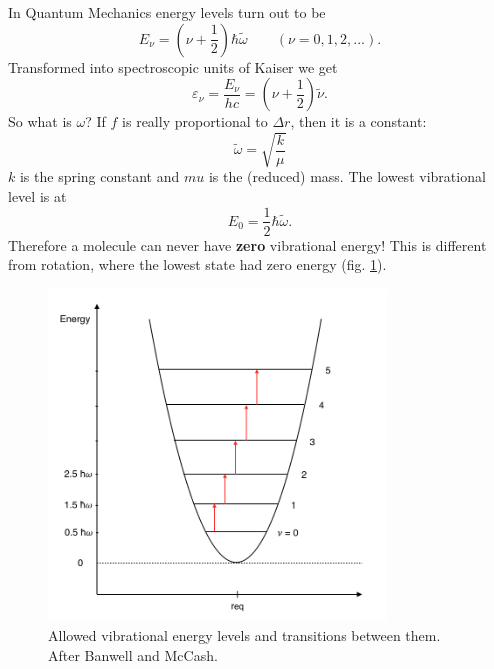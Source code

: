 \documentclass[a4paper,fleqn]{article}
\renewcommand{\epsilon}{\varepsilon}  %
\begin{document}
In Quantum Mechanics energy levels turn out to be 
\begin{equation}
E_\nu = (\nu+\frac{1}{2})\hbar\tilde{\omega} \qquad (\nu = 0, 1, 2, ...).
\end{equation}
Transformed into spectroscopic units of Kaiser we get
\begin{equation}
\epsilon_\nu = \frac{E_\nu}{hc} = (\nu + \frac{1}{2})\tilde{\nu}.
\end{equation}
So what is $\omega$? If $f$ is really proportional to $\Delta r$, then it is a constant:
\begin{equation}
\tilde{\omega} = \sqrt{\frac{k}{\mu}}
\end{equation}
$k$ is the spring constant and $mu$ is the (reduced) mass.
The lowest vibrational level is at
\begin{equation}
E_0 = \frac{1}{2} \hbar \tilde{\omega}.
\end{equation}
Therefore a molecule can never have \textbf{zero} vibrational energy! This is different from rotation, where the lowest state had zero energy (fig. \ref{Vibration_parabol_2}). \par

\begin{figure}[htbp]
\begin{center}
\includegraphics[width=0.8\textwidth]{figures/Vibration_parabol_2}
\caption{Allowed vibrational energy levels and transitions between them. After Banwell and McCash.}
\label{Vibration_parabol_2}
\end{center}
\end{figure}
\end{document}
